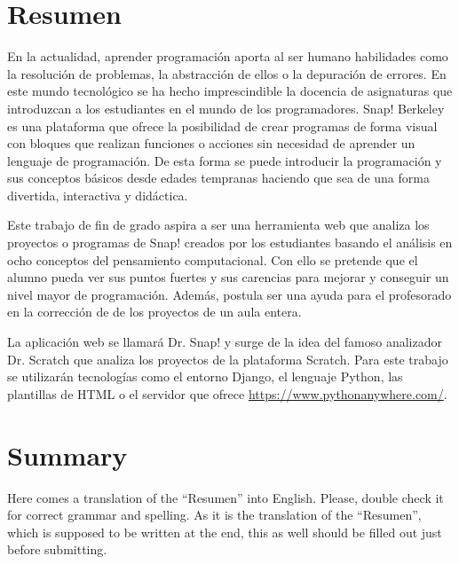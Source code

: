 \documentclass[a4paper, 12pt]{book}
\begin{document}

\chapter*{Resumen}

En la actualidad, aprender programación aporta al ser humano habilidades como la resolución de problemas, la abstracción de ellos o la depuración de errores. En este mundo tecnológico se ha hecho imprescindible la docencia de asignaturas que introduzcan a los estudiantes en el mundo de los programadores. Snap! Berkeley es una plataforma que ofrece la posibilidad de crear programas de forma visual con bloques que realizan funciones o acciones sin necesidad de aprender un lenguaje de programación. De esta forma se puede introducir la programación y sus conceptos básicos desde edades tempranas haciendo que sea de una forma divertida, interactiva y didáctica.

Este trabajo de fin de grado aspira a ser una herramienta web que analiza los proyectos o programas de Snap! creados por los estudiantes basando el análisis en ocho conceptos del pensamiento computacional. Con ello se pretende que el alumno pueda ver sus puntos fuertes y sus carencias para mejorar y conseguir un nivel mayor de programación. Además, postula ser una ayuda para el profesorado en la corrección de de los proyectos de un aula entera.

La aplicación web se llamará Dr. Snap! y surge de la idea del famoso analizador Dr. Scratch que analiza los proyectos de la plataforma Scratch. Para este trabajo se utilizarán tecnologías como el entorno Django, el lenguaje Python, las plantillas de HTML o el servidor que ofrece \url{https://www.pythonanywhere.com/}.


\chapter*{Summary}

Here comes a translation of the ``Resumen'' into English. 
Please, double check it for correct grammar and spelling.
As it is the translation of the ``Resumen'', which is supposed to be written at the end, this as well should be filled out just before submitting.
\end{document}
